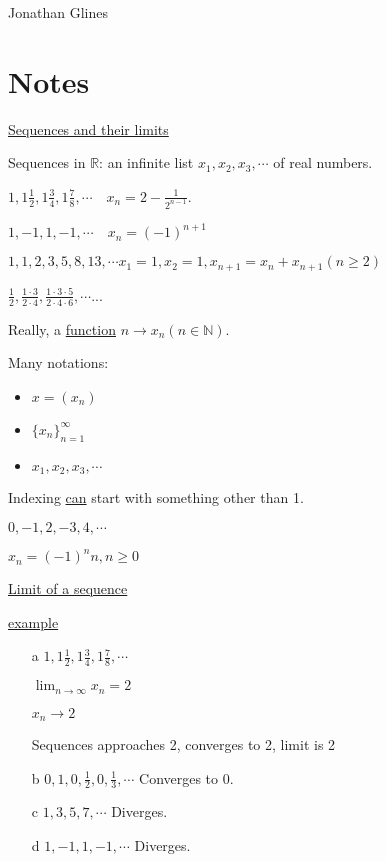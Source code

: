 \documentclass[12pt]{article}
\begin{document}
\begin{flushright}
\Large{Jonathan Glines}
\end{flushright}
\section*{Notes}
\underline{Sequences and their limits}

Sequences in $\mathbb{R}$: an infinite list $x_1, x_2, x_3, \cdots$ of real numbers.

$1, 1 \frac{1}{2}, 1 \frac{3}{4}, 1 \frac{7}{8}, \cdots \quad x_n = 2 - \frac{1}{2^{n-1}}$.

$1, -1, 1, -1, \cdots \quad x_n = \left(-1\right)^{n + 1}$

$1, 1, 2, 3, 5, 8, 13, \cdots x_1 = 1, x_2 = 1, x_{n + 1} = x_n + x_{n + 1} (n \geq 2)$ 

$\frac{1}{2} , \frac{1 \cdot 3}{2 \cdot 4}, \frac{1 \cdot 3\cdot 5}{2\cdot 4 \cdot 6}, \cdots$...

Really, a \underline{function} $n \rightarrow x_n \left(n \in \mathbb{N}\right)$.

Many notations:
\begin{itemize}
\item $x = (x_n)$
\item $\{x_n\}_{n=1}^\infty$
\item $x_1, x_2, x_3, \cdots$
\end{itemize}

Indexing \underline{can} start with something other than 1.

$0, -1, 2, -3, 4, \cdots$

$x_n=(-1)^n n, n \geq 0$

\underline{Limit of a sequence}

\underline{example}
\begin{itemize}
\item[a] $1, 1\frac{1}{2}, 1 \frac{3}{4}, 1\frac{7}{8}, \cdots$

$\lim_{n \to \infty} x_n = 2$

$x_n \rightarrow 2$

Sequences approaches 2, converges to 2, limit is 2

\item[b] $0, 1, 0, \frac{1}{2}, 0, \frac{1}{3}, \cdots$
Converges to 0.

\item[c] $1, 3, 5, 7, \cdots$  Diverges.

\item[d] $1, -1, 1, -1, \cdots$ Diverges.
\end{itemize}
\end{document}
